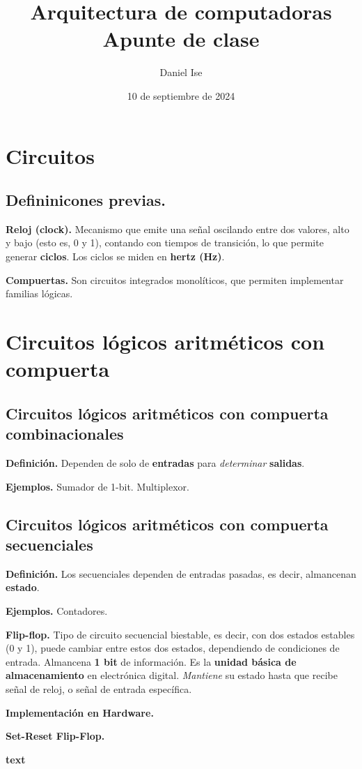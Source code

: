 \documentclass{article}
\title{Arquitectura de computadoras\\Apunte de clase}
\author{Daniel Ise}
\date{10 de septiembre de 2024}
\begin{document}
\maketitle

\tableofcontents

\section{Circuitos}

\subsection{Defininicones previas.}

\textbf{Reloj (clock).} 
Mecanismo que emite una señal oscilando entre dos valores,
alto y bajo (esto es, 0 y 1), 
contando con tiempos de transición,
lo que permite generar \textbf{ciclos}. 
Los ciclos se miden en \textbf{hertz (Hz)}.

\textbf{Compuertas.}
Son circuitos integrados monolíticos,
que permiten implementar familias lógicas.

\section{Circuitos lógicos aritméticos con compuerta}

\subsection{Circuitos lógicos aritméticos con compuerta combinacionales}

\textbf{Definición.}
Dependen de solo de \textbf{entradas} 
para \textit{determinar} \textbf{salidas}.

\textbf{Ejemplos.} 
Sumador de 1-bit.
Multiplexor.

\subsection{Circuitos lógicos aritméticos con compuerta secuenciales}

\textbf{Definición.}
Los secuenciales dependen de entradas pasadas,
es decir,
almancenan \textbf{estado}.

\textbf{Ejemplos.}
Contadores.

\textbf{Flip-flop.}
Tipo de circuito secuencial biestable,
es decir, con dos estados estables (0 y 1),
puede cambiar entre estos dos estados,
dependiendo de condiciones de entrada.
Almancena \textbf{1 bit} de información.
Es la \textbf{unidad básica de almacenamiento} en
electrónica digital.
\textit{Mantiene} su estado hasta que recibe señal de reloj,
o señal de entrada específica.

\textbf{Implementación en Hardware.} 

\textbf{Set-Reset Flip-Flop.}

\textbf{text}
\end{document}
